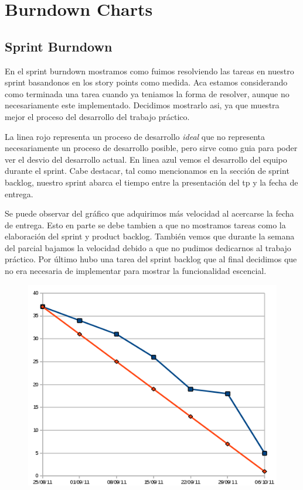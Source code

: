 \section{Burndown Charts}
\subsection*{Sprint Burndown}

En el sprint burndown mostramos como fuimos resolviendo las tareas en nuestro sprint basandonos en los story points como medida.
Aca estamos considerando como terminada una tarea cuando ya teniamos la forma de resolver, aunque no necesariamente este implementado.
Decidimos mostrarlo asi, ya que muestra mejor el proceso del desarrollo del trabajo pr\'actico.

La linea rojo representa un proceso de desarrollo \emph{ideal} que no representa necesariamente un proceso de desarrollo posible, pero
sirve como guia para poder ver el desvio del desarrollo actual.
En linea azul vemos el desarrollo del equipo durante el sprint. Cabe destacar, tal como mencionamos en la secci\'on de sprint backlog,
nuestro sprint abarca el tiempo entre la presentaci\'on del tp y la fecha de entrega.

Se puede observar del gr\'afico que adquirimos m\'as velocidad al acercarse la fecha de entrega. Esto en parte se debe tambien a que no mostramos
tareas como la elaboraci\'on del sprint y product backlog. Tambi\'en vemos que durante la semana del parcial bajamos la velocidad
debido a que no pudimos dedicarnos al trabajo pr\'actico. Por \'ultimo hubo una tarea del sprint backlog que al final decidimos que
no era necesaria de implementar para mostrar la funcionalidad escencial.

\begin{figure}[H]
\begin{center}
 \includegraphics[scale=0.6]{burn3.png}
\end{center}
\end{figure}
\newpage
